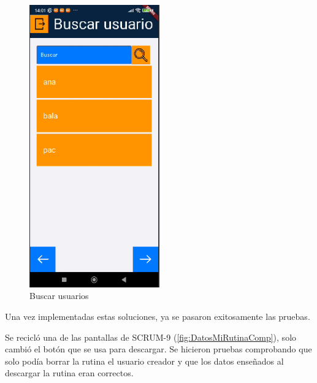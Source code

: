 \begin{figure}[H]
   \centering
    \includegraphics[width=0.5\textwidth]{pantallas/buscarUser.png}
    \caption{Buscar usuarios}
    \label{fig:buscarUser}
\end{figure}

Una vez implementadas estas soluciones, ya se pasaron exitosamente las pruebas.


Se recicló una de las pantallas de SCRUM-9 (\cref{fig:DatosMiRutinaComp}), solo cambió el botón que se usa para descargar. Se hicieron pruebas comprobando que solo podía borrar la rutina el usuario creador y que los datos enseñados al descargar la rutina eran correctos.

